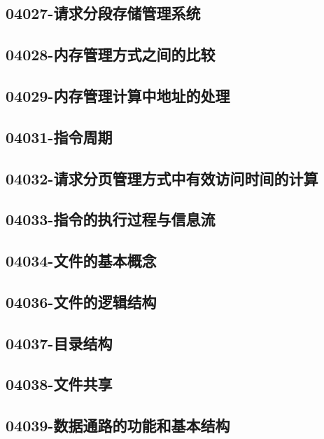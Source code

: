\subsection{04027-请求分段存储管理系统}

\subsection{04028-内存管理方式之间的比较}

\subsection{04029-内存管理计算中地址的处理}

\subsection{04031-指令周期}

\subsection{04032-请求分页管理方式中有效访问时间的计算}

\subsection{04033-指令的执行过程与信息流}

\subsection{04034-文件的基本概念}

\subsection{04036-文件的逻辑结构}

\subsection{04037-目录结构}

\subsection{04038-文件共享}

\subsection{04039-数据通路的功能和基本结构}

